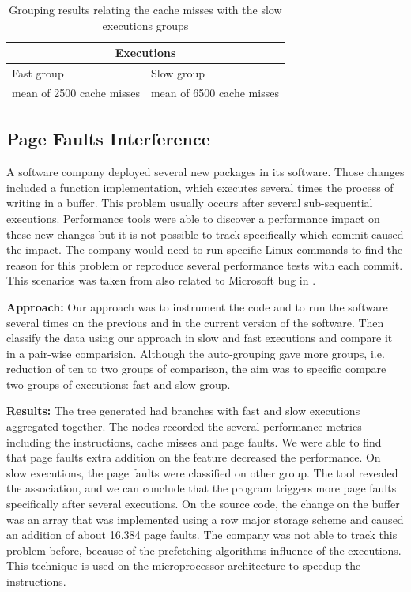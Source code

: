 \begin{table}[h]
    \centering
    \caption{Grouping results relating the cache misses with the slow executions groups}
    \label{tab:table}
    \begin{tabular}{ll}
        
        \multicolumn{2}{c}{Executions}                        \\ \hline
        Fast group                & Slow group                \\ \hline
        mean of 2500 cache misses & mean of 6500 cache misses \\ \hline
    \end{tabular}
\end{table}


\subsection{\textbf{Page Faults Interference}}
	A software company deployed several new packages in its software. Those changes included a function implementation, which executes several times the process of writing in a buffer. This problem usually occurs  after several sub-sequential executions.
Performance tools were able to discover a performance impact on these new changes but it is not possible to track specifically which commit caused the impact. The company would need to run specific Linux commands to find the reason for this problem or reproduce several performance tests with each commit. This scenarios was taken from \cite{essentials} also related to Microsoft bug in \cite{microsoft_bug}. 

\textbf{Approach:}
    Our approach was to instrument the code and to run the software several times on the previous and in the current version of the software. Then classify the data using our approach in slow and fast executions and compare it in a pair-wise comparision. Although the auto-grouping gave more groups, i.e. reduction of ten to two groups of comparison, the aim was to specific compare two groups of executions: fast and slow group.


  
\textbf{Results:}
    The tree generated had branches with fast and slow executions aggregated together. The nodes recorded the several performance metrics including the instructions, cache misses and page faults. We were able to find that page faults extra addition on the feature decreased the performance. On slow executions, the page faults were classified on other group. The tool revealed the association, and we can conclude that the program triggers more page faults specifically after several executions.
	On the source code, the change on the buffer was an array that was implemented using a row major storage scheme and caused an addition of about 16.384 page faults.
     The company was not able to track this problem before, because of the prefetching algorithms influence of the executions. This technique is used on the microprocessor architecture to speedup the instructions. 

